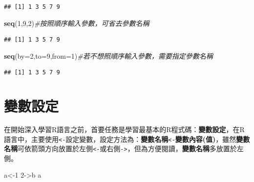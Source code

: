 \documentclass[]{book}
\newenvironment{Shaded}{\begin{snugshade}}{\end{snugshade}}
\newcommand{\KeywordTok}[1]{\textcolor[rgb]{0.13,0.29,0.53}{\textbf{{#1}}}}
\newcommand{\DataTypeTok}[1]{\textcolor[rgb]{0.13,0.29,0.53}{{#1}}}
\newcommand{\DecValTok}[1]{\textcolor[rgb]{0.00,0.00,0.81}{{#1}}}
\newcommand{\CommentTok}[1]{\textcolor[rgb]{0.56,0.35,0.01}{\textit{{#1}}}}
\newcommand{\NormalTok}[1]{{#1}}
\theoremstyle{definition}
\theoremstyle{definition}
\theoremstyle{remark}
\begin{document}
\begin{Shaded}
\end{Shaded}

\begin{verbatim}
## [1] 1 3 5 7 9
\end{verbatim}

\begin{Shaded}
\begin{Highlighting}[]
\KeywordTok{seq}\NormalTok{(}\DecValTok{1}\NormalTok{,}\DecValTok{9}\NormalTok{,}\DecValTok{2}\NormalTok{)}\CommentTok{#按照順序輸入參數，可省去參數名稱}
\end{Highlighting}
\end{Shaded}

\begin{verbatim}
## [1] 1 3 5 7 9
\end{verbatim}

\begin{Shaded}
\begin{Highlighting}[]
\KeywordTok{seq}\NormalTok{(}\DataTypeTok{by=}\DecValTok{2}\NormalTok{,}\DataTypeTok{to=}\DecValTok{9}\NormalTok{,}\DataTypeTok{from=}\DecValTok{1}\NormalTok{)}\CommentTok{#若不想照順序輸入參數，需要指定參數名稱}
\end{Highlighting}
\end{Shaded}

\begin{verbatim}
## [1] 1 3 5 7 9
\end{verbatim}

\section{變數設定}

在開始深入學習R語言之前，首要任務是學習最基本的R程式碼：\textbf{變數設定}，在R語言中，主要使用\texttt{\textless{}-}設定變數，設定方法為：\textbf{變數名稱}\texttt{\textless{}-}\textbf{變數內容(值)}，雖然\textbf{變數名稱}可依箭頭方向放置於左側\texttt{\textless{}-}或右側\texttt{-\textgreater{}}，但為方便閱讀，\textbf{變數名稱}多放置於左側。

\begin{Shaded}
\begin{Highlighting}[]
\NormalTok{a<-}\DecValTok{1} 
\DecValTok{2}\NormalTok{->b}
\NormalTok{a}
\end{Highlighting}
\end{Shaded}
\end{document}
